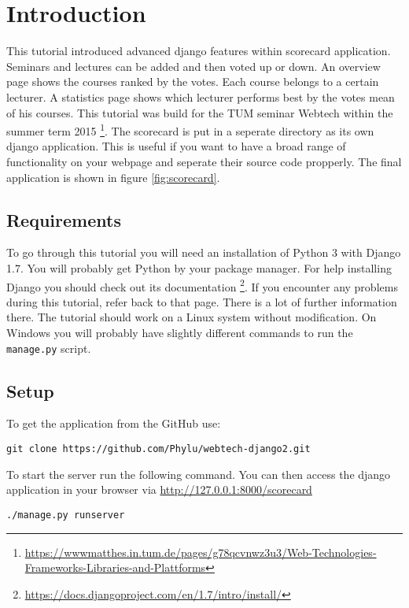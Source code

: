\section{Introduction}

This tutorial introduced advanced django features within scorecard application. Seminars and lectures can be added and then voted up or down. An overview page shows the courses ranked by the votes. Each course belongs to a certain lecturer. A statistics page shows which lecturer performs best by the votes mean of his courses. This tutorial was build for the TUM seminar Webtech within the summer term 2015 \footnote{\url{https://wwwmatthes.in.tum.de/pages/g78qcvnwz3u3/Web-Technologies-Frameworks-Libraries-and-Plattforms}}. The scorecard is put in a seperate directory as its own django application. This is useful if you want to have a broad range of functionality on your webpage and seperate their source code propperly. The final application is shown in figure \ref{fig:scorecard}.


\subsection{Requirements}

To go through this tutorial you will need an installation of Python 3 with Django 1.7. You will probably get Python by your package manager. For help installing Django you should check out its documentation \footnote{\url{https://docs.djangoproject.com/en/1.7/intro/install/}}. If you encounter any problems during this tutorial, refer back to that page. There is a lot of further information there. The tutorial should work on a Linux system without modification. On Windows you will probably have slightly different commands to run the \lstinline|manage.py| script.

\subsection{Setup}

To get the application from the GitHub use:
\begin{lstlisting}[style=Bash, caption=Clone application, label=lst:clone_app]
git clone https://github.com/Phylu/webtech-django2.git
\end{lstlisting}

To start the server run the following command. You can then access the django application in your browser via \url{http://127.0.0.1:8000/scorecard}
\begin{lstlisting}[style=Bash, caption=Run development server, label=lst:run_server]
./manage.py runserver
\end{lstlisting}